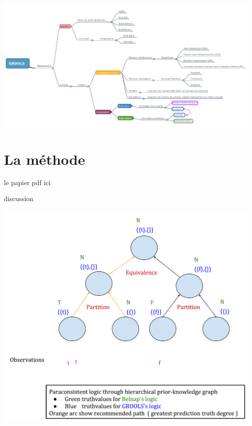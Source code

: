 \begin{refsegment}
\begin{shadedfigure}
    \centering
    \includegraphics[width=\textwidth]{img/GROOLS_mindmap.pdf}
    \caption{  }
    \label{fig:GROOLS_mindmap}
\end{shadedfigure}

\section{La méthode}
le papier
pdf ici

discussion

\begin{shadedfigure}
    \centering
    \includegraphics[width=\textwidth]{img/GROOLS_vs_belnap_1.pdf}
    \caption{  }
    \label{fig:grools_belnap_1}
\end{shadedfigure}


\end{refsegment}
